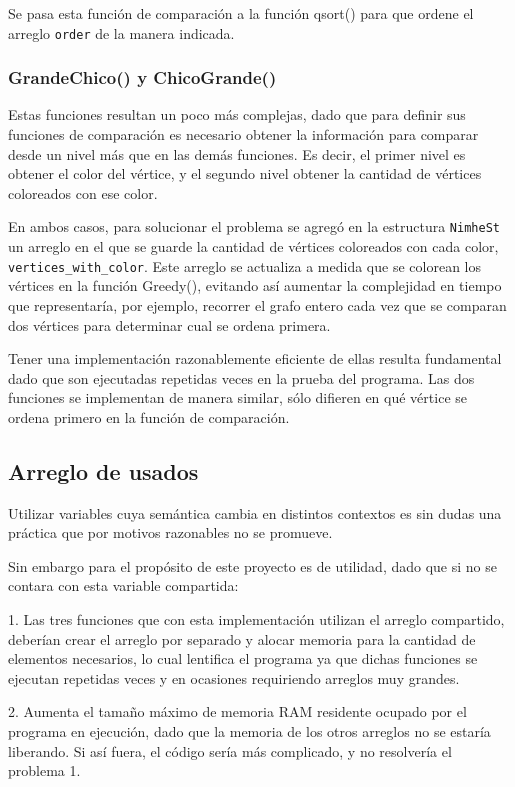\documentclass[11pt,a4paper]{article}
\theoremstyle{plain}
\begin{document}
Se pasa esta función de comparación a la función qsort() para que ordene el arreglo \texttt{order} de la manera indicada.

		\subsubsection{GrandeChico() y ChicoGrande()}
		\label{7.5.2}
	
Estas funciones resultan un poco más complejas, dado que para definir sus funciones de comparación es necesario obtener la información para comparar desde un nivel más que en las demás funciones. Es decir, el primer nivel es obtener el color del vértice, y el segundo nivel obtener la cantidad de vértices coloreados con ese color.

En ambos casos, para solucionar el problema se agregó en la estructura \texttt{NimheSt} un arreglo en el que se guarde la cantidad de vértices coloreados con cada color, \texttt{vertices\_with\_color}. Este arreglo se actualiza a medida que se colorean los vértices en la función Greedy(), evitando así aumentar la complejidad en tiempo que representaría, por ejemplo, recorrer el grafo entero cada vez que se comparan dos vértices para determinar cual se ordena primera.

Tener una implementación razonablemente eficiente de ellas resulta fundamental dado que son ejecutadas repetidas veces en la prueba del programa. Las dos funciones se implementan de manera similar, sólo difieren en qué vértice se ordena primero en la función de comparación.

	\subsection{Arreglo de usados}
	\label{sec:7.6}

Utilizar variables cuya semántica cambia en distintos contextos es sin dudas una práctica que por motivos razonables no se promueve. 

Sin embargo para el propósito de este proyecto es de utilidad, dado que si no se contara con esta variable compartida: 

1. Las tres funciones que con esta implementación utilizan el arreglo compartido, deberían crear el arreglo por separado y alocar memoria para la cantidad de elementos necesarios, lo cual lentifica el programa ya que dichas funciones se ejecutan repetidas veces y en ocasiones requiriendo arreglos muy grandes.

2. Aumenta el tamaño máximo de memoria RAM residente ocupado por el programa en ejecución, dado que la memoria de los otros arreglos no se estaría liberando. Si así fuera, el código sería más complicado, y no resolvería el problema 1.
\end{document}
